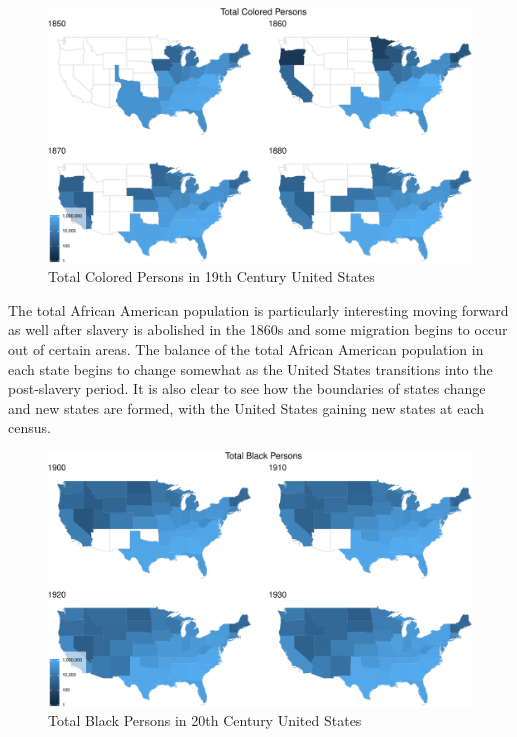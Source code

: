 \documentclass[11pt,]{article}
\begin{document}
\begin{figure}[htbp]
\centering
\includegraphics{writeup_files/figure-latex/unnamed-chunk-7-1.pdf}
\caption{Total Colored Persons in 19th Century United States}
\end{figure}

The total African American population is particularly interesting moving
forward as well after slavery is abolished in the 1860s and some
migration begins to occur out of certain areas. The balance of the total
African American population in each state begins to change somewhat as
the United States transitions into the post-slavery period. It is also
clear to see how the boundaries of states change and new states are
formed, with the United States gaining new states at each census.

\begin{figure}[htbp]
\centering
\includegraphics{writeup_files/figure-latex/unnamed-chunk-8-1.pdf}
\caption{Total Black Persons in 20th Century United States}
\end{figure}
\end{document}
